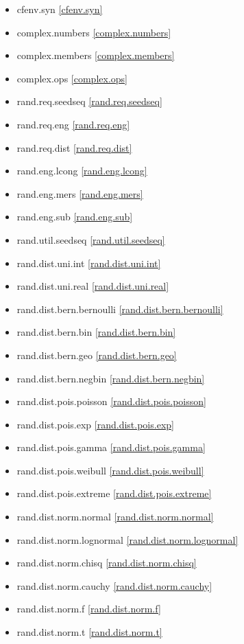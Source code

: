\begin{multicols}{3}
\begin{itemize}
\item{cfenv.syn}				\ref{cfenv.syn}
\item{complex.numbers}			\ref{complex.numbers}
\item{complex.members}			\ref{complex.members}
\item{complex.ops}				\ref{complex.ops}
\item{rand.req.seedseq}			\ref{rand.req.seedseq}
\item{rand.req.eng}				\ref{rand.req.eng}
\item{rand.req.dist}			\ref{rand.req.dist}
\item{rand.eng.lcong}			\ref{rand.eng.lcong}
\item{rand.eng.mers}			\ref{rand.eng.mers}
\item{rand.eng.sub}				\ref{rand.eng.sub}
\item{rand.util.seedseq}		\ref{rand.util.seedseq}
\item{rand.dist.uni.int}		\ref{rand.dist.uni.int}
\item{rand.dist.uni.real}		\ref{rand.dist.uni.real}
\item{rand.dist.bern.bernoulli}	\ref{rand.dist.bern.bernoulli}
\item{rand.dist.bern.bin}		\ref{rand.dist.bern.bin}
\item{rand.dist.bern.geo}		\ref{rand.dist.bern.geo}
\item{rand.dist.bern.negbin}	\ref{rand.dist.bern.negbin}
\item{rand.dist.pois.poisson}	\ref{rand.dist.pois.poisson}
\item{rand.dist.pois.exp}		\ref{rand.dist.pois.exp}
\item{rand.dist.pois.gamma}		\ref{rand.dist.pois.gamma}
\item{rand.dist.pois.weibull}	\ref{rand.dist.pois.weibull}
\item{rand.dist.pois.extreme}	\ref{rand.dist.pois.extreme}
\item{rand.dist.norm.normal}	\ref{rand.dist.norm.normal}
\item{rand.dist.norm.lognormal}	\ref{rand.dist.norm.lognormal}
\item{rand.dist.norm.chisq}		\ref{rand.dist.norm.chisq}
\item{rand.dist.norm.cauchy}	\ref{rand.dist.norm.cauchy}
\item{rand.dist.norm.f}			\ref{rand.dist.norm.f}
\item{rand.dist.norm.t}			\ref{rand.dist.norm.t}

\end{itemize}
\end{multicols}
